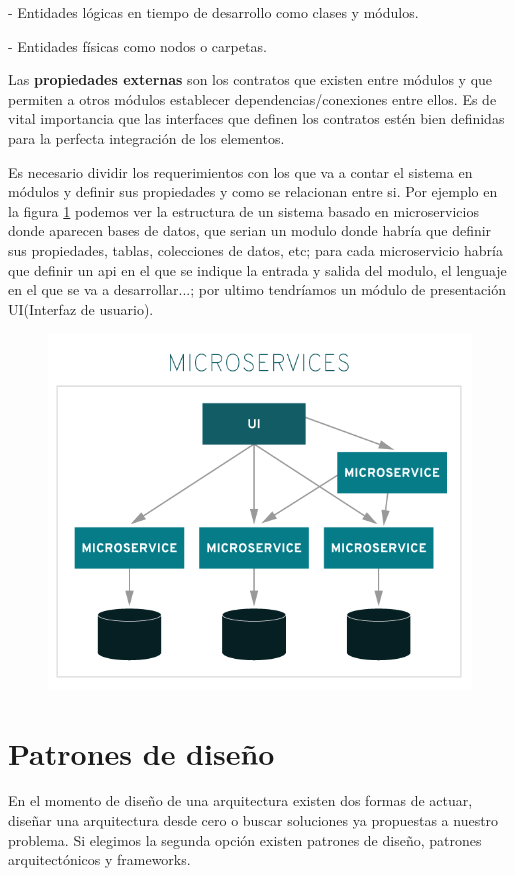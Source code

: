 \documentclass[12pt]{report} %
\begin{document}
	- Entidades lógicas en tiempo de desarrollo como clases y módulos.
	
	- Entidades físicas como nodos o carpetas.	
	
	Las \textbf{propiedades externas} son los contratos que existen entre módulos y que permiten a otros módulos establecer dependencias/conexiones entre ellos. Es de vital importancia que las interfaces que definen los contratos estén bien definidas para la perfecta integración de los elementos.
	
	Es necesario dividir los requerimientos con los que va a contar el sistema en módulos y definir sus propiedades y como se relacionan entre si. Por ejemplo en la figura \ref{fig:microservices} podemos ver la estructura de un sistema basado en microservicios donde aparecen bases de datos, que serian un modulo donde habría que definir sus propiedades, tablas, colecciones de datos, etc; para cada microservicio habría que definir un api en el que se indique la entrada y salida del modulo, el lenguaje en el que se va a desarrollar...; por ultimo tendríamos un módulo de presentación UI(Interfaz de usuario).
	\begin{figure}
		\centering
		\includegraphics[width=0.7\linewidth]{imagenes/monolithic-vs-microservices}
		\caption{}
		\label{fig:microservices}
	\end{figure}

	\section{Patrones de diseño}
	 En el momento de diseño de una arquitectura existen dos formas de actuar, diseñar una arquitectura desde cero o buscar soluciones ya propuestas a nuestro problema. Si elegimos la segunda opción existen patrones de diseño, patrones arquitectónicos y frameworks.
	 
\end{document}
